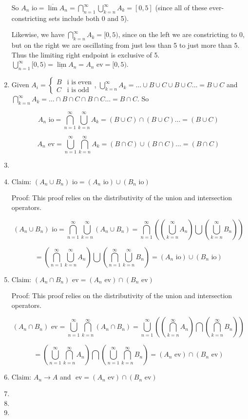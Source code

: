 \documentclass[12pt]{article}
\begin{document}
\begin{enumerate}
So $A_n \mbox{ io}=\overline{\lim} A_n = \bigcap^\infty_{n=1} \bigcup_{k=n}^\infty A_k = [0,5]$ (since all of these ever-constricting sets include both 0 and 5).

Likewise, we have $\bigcap^\infty_{k=n} A_k = [0,5)$, since on the left we are constricting to 0, but on the right we are oscillating from just less than 5 to just more than 5. Thus the limiting right endpoint is exclusive of 5. $\bigcup^\infty_{n=1}[0,5)=\underline{\lim} A_n= A_n \mbox{ ev}=[0,5)$.

\item Given $A_i= \begin{cases} B & \mbox{i is even} \\ C & \mbox{i is odd} \end{cases}$, $\bigcup^\infty_{k=n} A_k = \dots \cup B \cup C \cup B \cup C \dots = B \cup C$ and $\bigcap^\infty_{k=n} A_k = \dots \cap B \cap C \cap B \cap C \dots = B \cap C$. So 

$$ A_n \mbox{ io}=\bigcap^\infty_{n=1}\bigcup^\infty_{k=n} A_k = (B \cup C) \cap (B \cup C)\dots = (B \cup C)$$

$$ A_n \mbox{ ev}=\bigcup^\infty_{n=1}\bigcap^\infty_{k=n} A_k = (B \cap C) \cup (B \cap C)\dots = (B \cap C)$$

\item

\item Claim: $(A_n \cup B_n)\mbox{ io} = (A_n \mbox{ io})\cup (B_n\mbox{ io})$

Proof: This proof relies on the distributivity of the union and intersection operators. 

$$(A_n \cup B_n)\mbox{ io} = \bigcap^\infty_{n=1}\bigcup^\infty_{k=n}(A_n \cup B_n) = \bigcap^\infty_{n=1} \left( \left( \bigcup^\infty_{k=n}A_n \right) \bigcup \left( \bigcup^\infty_{k=n}B_n \right) \right)$$

$$ = \left( \bigcap^\infty_{n=1}\bigcup^\infty_{k=n}A_n \right) \bigcup \left( \bigcap^\infty_{n=1} \bigcup^\infty_{k=n}B_n \right) = (A_n \mbox{ io})\cup (B_n\mbox{ io}) $$

\item Claim: $(A_n \cap B_n)\mbox{ ev} = (A_n \mbox{ ev})\cap (B_n\mbox{ ev})$

Proof: This proof relies on the distributivity of the union and intersection operators. 

$$(A_n \cap B_n)\mbox{ ev} = \bigcup^\infty_{n=1}\bigcap^\infty_{k=n}(A_n \cap B_n) = \bigcup^\infty_{n=1} \left( \left( \bigcap^\infty_{k=n}A_n \right) \bigcap \left( \bigcap^\infty_{k=n}B_n \right) \right)$$

$$ = \left( \bigcup^\infty_{n=1}\bigcap^\infty_{k=n}A_n \right) \bigcap \left( \bigcup^\infty_{n=1} \bigcap^\infty_{k=n}B_n \right) = (A_n \mbox{ ev})\cap (B_n\mbox{ ev}) $$

\item Claim: $A_n \to A$ and $\mbox{ ev} = (A_n \mbox{ ev})\cap (B_n\mbox{ ev})$

\item

\item

\item

\end{enumerate}
\end{document}
